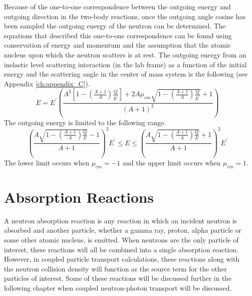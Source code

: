Because of the one-to-one correspondence between the outgoing energy and
outgoing direction in the two-body reactions, once the outgoing angle cosine
has been sampled the outgoing energy of the neutron can be determined. The
equations that described this one-to-one correspondence can be found using
conservation of energy and momentum and the assumption that the atomic nucleus
upon which the neutron scatters is at rest. The outgoing energy from an 
inelastic level scattering interaction (in the lab frame) as a function of the 
initial energy and the scattering angle in the center of mass system is the 
following (see Appendix \ref{ch:appendix_C}).
\begin{equation}
  E = E^{'} \left(\frac{A^2\left[1-\left(\frac{A+1}{A}\right)\frac{Q}{E^{'}}
      \right]+ 2A\mu_{cm}\sqrt{1 - \left(\frac{A+1}{A}\right)\frac{Q}{E^{'}}}
     + 1}{\left(A+1\right)^2}\right) 
  \label{eq:neutron_outgoing_energy}
\end{equation}
The outgoing energy is limited to the following range.
\begin{equation}
  \left(\frac{A\sqrt{1-\left(\frac{A+1}{A}\right)\frac{Q}{E}}-1}{A+1}\right)^2
  E^{'} \leq E \leq 
  \left(\frac{A\sqrt{1-\left(\frac{A+1}{A}\right)\frac{Q}{E}}+1}{A+1}\right)^2
    E^{'}
\end{equation}
The lower limit occurs when $\mu_{cm} = -1$ and the upper limit occurs when
$\mu_{cm} = 1$.

\section{Absorption Reactions}
A neutron absorption reaction is any reaction in which an incident neutron is
absorbed and another particle, whether a gamma ray, proton, alpha particle or
some other atomic nucleus, is emitted. When neutrons are the only particle of
interest, these reactions will all be combined into a single absorption
reaction. However, in coupled particle transport calculations, these reactions
along with the neutron collision density will function as the source term for
the other particles of interest. Some of these reactions will be discussed 
further in the following chapter when coupled neutron-photon transport will
be discussed. 

